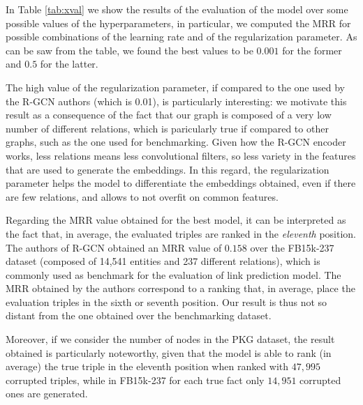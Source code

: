 \documentclass[%
    corpo=13.5pt,
    twoside,
    oldstyle,
    tipotesi=magistrale,
    greek,
    evenboxes
]{toptesi}
\begin{document}
In Table \ref{tab:xval} we show the results of the evaluation of the model over
some possible values of the hyperparameters, in particular, we computed the
MRR for possible combinations of the learning rate and of the regularization
parameter.
As can be saw from the table, we found the best values to be $0.001$ for the
former and $0.5$ for the latter.

The high value of the regularization parameter, if compared to the one
used by the R-GCN authors (which is 0.01), is particularly interesting: we
motivate this result as a consequence of the fact that our
graph is composed of a very low number of different relations, which is
paricularly true if compared to other graphs, such as the one used
for benchmarking.
Given how the R-GCN encoder works, less relations means less convolutional
filters, so less variety in the features that are used to generate
the embeddings.
In this regard, the regularization parameter helps the model to differentiate
the embeddings obtained, even if there are few relations, and allows to
not overfit on common features.

Regarding the MRR value obtained for the best model, it can be interpreted as
the fact that, in average, the evaluated triples are ranked in the
\emph{eleventh} position.
The authors of R-GCN obtained an MRR value of $0.158$ over the FB15k-237
dataset (composed of 14,541 entities and 237 different relations), which is
commonly used as benchmark for the evaluation of link prediction model.
The MRR obtained by the authors correspond to a ranking that, in average,
place the evaluation triples in the sixth or seventh position. Our result
is thus not so distant from the
one obtained over the benchmarking dataset.

Moreover, if we consider the number of nodes in the PKG dataset, the result
obtained is particularly noteworthy, given that the model is able to rank
(in average) the true triple in the eleventh position when ranked with $47,995$
corrupted triples, while in FB15k-237 for each true fact only
$14,951$ corrupted ones are generated.
\end{document}
